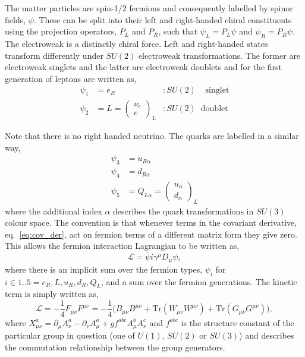 The matter particles are spin-1/2 fermions and consequently labelled by spinor fields, $\psi$. These can be split into their left and right-handed chiral constituents using the projection operators, $P_{L}$ and $P_{R}$, such that $\psi_{L}=P_{L}\psi$ and $\psi_{R}=P_{R}\psi$.
The electroweak is a distinctly chiral force. Left and right-handed states transform differently under $SU(2)$ electroweak transformations. The former are electroweak singlets and the latter are electroweak doublets and for the first generation of leptons are written as,
\begin{align}
  \psi_{1} & = e_{R} &:SU(2)\;\;\;\;\mathrm{singlet} \\
  \psi_{2} & = L = \begin{pmatrix} \nu_{e} \\[-0.05cm] e \end{pmatrix}_{L} &:SU(2)\;\;\mathrm{doublet} 
\end{align}

Note that there is no right handed neutrino. The quarks are labelled in a similar way,
\begin{align}
  \psi_{3} & = u_{R\alpha} \\
  \psi_{4} & = d_{R\alpha} \\
  \psi_{5} & = Q_{L\alpha} = \begin{pmatrix} u_{\alpha} \\[-0.05cm] d_{\alpha} \end{pmatrix}_{L}  
\end{align}
where the additional index $\alpha$ describes the quark transformations in $SU(3)$ colour space. The convention is that whenever terms in the covariant derivative, eq.~\ref{eq:cov_der}, act on fermion terms of a different matrix form they give zero. This allows the \SM fermion interaction Lagrangian to be written as,
\begin{equation}
  \mathcal{L} = \bar{\psi}i\gamma^{\mu}D_{\mu}\psi,
\end{equation}
where there is an implicit sum over the fermion types, $\psi_{i}$ for $i\in{1..5}=e_{R}, L, u_{R}, d_{R}, Q_{L}$, and a sum over the fermion generations. The kinetic term is simply written as,
\begin{equation}
  \mathcal{L} = -\frac{1}{4}F_{\mu\nu}F^{\mu\nu} = -\frac{1}{4}\biggl( B_{\mu\nu}B^{\mu\nu} + \mathrm{Tr} (W_{\mu\nu}W^{\mu\nu}) + \mathrm{Tr} (G_{\mu\nu}G^{\mu\nu}) \biggr),
\end{equation}
where $X^{a}_{\mu\nu} = \partial_{\mu}A^{a}_{\nu}-\partial_{\nu}A^{a}_{\mu}+gf^{abc}A^{b}_{\mu}A^{c}_{\nu}$ and $f^{abc}$ is the structure constant of the particular group in question (one of $U(1)$, $SU(2)$ or $SU(3)$) and describes the commutation relationship between the group generators. %

